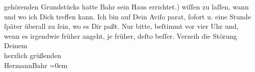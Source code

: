 \begin{ledgroupsized}[t]{13cm}
{{{                  gehörenden Grundstücks hatte Bahr sein Haus
                  errichtet.}}}\label{K_L01098_1h}) wiſſen zu laſſen, wann und wo ich Dich treffen kann. Ich bin
               auf Dein Aviſo parat, ſofort \label{K_L01098_2v}\label{K_L01098_2h} u. eine Stunde ſpäter überall zu ſein, wo es Dir
               paßt. Nur bitte, beſtimmt vor vier {\pb}Uhr und, wenn
               es irgendwie früher angeht, je früher, deſto beſſer.\pend
           \pstart
           Verzeih die Störung{\\[\baselineskip]}Deinem{\\[\baselineskip]}herzlich grüßenden{\\[\baselineskip]}\spacefill\mbox{HermannBahr}\pend
           \leftskip=0em{}\endnumbering{}\end{ledgroupsized}  \newcommand{\dateiname}{L01098}\newcommand{\titel}{Hermann Bahr an Arthur Schnitzler, 20. 2. [1901]}\newcommand{\editorInnen}{ Kurt Ifkovits,  Martin Anton Müller}
            \footnotesize
\begin{ledgroupsized}[t]{11.5cm}
\end{ledgroupsized}
         
      